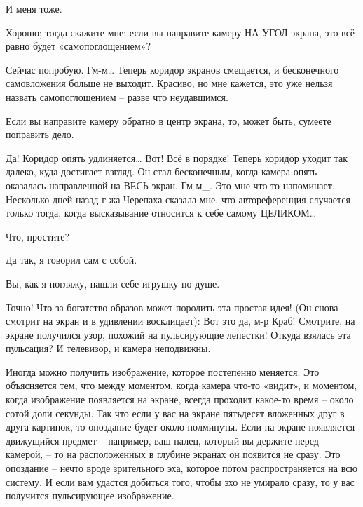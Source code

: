 \documentclass[../main.tex]{subfiles}
\begin{document}
\begin{dialogue}
 И меня тоже.

 Хорошо; тогда скажите мне: если вы направите камеру НА УГОЛ экрана, это всё равно будет «самопоглощением»?

 Сейчас попробую. Гм-м\ldots{} Теперь коридор экранов смещается, и бесконечного самовложения больше не выходит. Красиво, но мне кажется, это уже нельзя назвать самопоглощением \--- разве что неудавшимся.

 Если вы направите камеру обратно в центр экрана, то, может быть, сумеете поправить дело.

 Да! Коридор опять удлиняется\ldots{} Вот! Всё в порядке! Теперь коридор уходит так далеко, куда достигает взгляд. Он стал бесконечным, когда камера опять оказалась направленной на ВЕСЬ экран. Гм-м\_. Это мне что-то напоминает. Несколько дней назад г-жа Черепаха сказала мне, что автореференция случается только тогда, когда высказывание относится к себе самому ЦЕЛИКОМ\ldots{}

 Что, простите?

 Да так, я говорил сам с собой.


 Вы, как я погляжу, нашли себе игрушку по душе.

 Точно! Что за богатство образов может породить эта простая идея! (Он снова смотрит на экран и в удивлении восклицает): Вот это да, м-р Краб! Смотрите, на экране получился узор, похожий на пульсирующие лепестки! Откуда взялась эта пульсация? И телевизор, и камера неподвижны.

 Иногда можно получить изображение, которое постепенно меняется. Это объясняется тем, что между моментом, когда камера что-то «видит», и моментом, когда изображение появляется на экране, всегда проходит какое-то время \--- около сотой доли секунды. Так что если у вас на экране пятьдесят вложенных друг в друга картинок, то опоздание будет около полминуты. Если на экране появляется движущийся предмет \--- например, ваш палец, который вы держите перед камерой, \--- то на расположенных в глубине экранах он появится не сразу. Это опоздание \--- нечто вроде зрительного эха, которое потом распространяется на всю систему. И если вам удастся добиться того, чтобы эхо не умирало сразу, то у вас получится пульсирующее изображение.


\end{dialogue}
\end{document}
